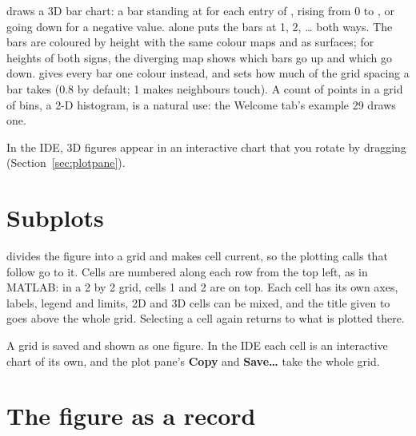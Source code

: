 \documentclass[11pt,a4paper,openany]{report}
\begin{document}
{{


 draws a 3D bar chart: a bar standing at
 for each entry of , rising from 0 to
, or going down for a negative value.  alone
puts the bars at 1, 2, \ldots{} both ways. The bars are coloured by height
with the same colour maps and  as surfaces; for heights of both
signs, the diverging map  shows which bars go up and which go
down.  gives every bar one colour instead, and  sets
how much of the grid spacing a bar takes (0.8 by default; 1 makes neighbours
touch). A count of points in a grid of bins, a 2-D histogram, is a natural use:
the Welcome tab's example 29 draws one.


In the IDE, 3D figures appear in an interactive chart that you rotate by
dragging (Section~\ref{sec:plotpane}).

\section{Subplots}

 divides the figure into a grid and makes cell
 current, so the plotting calls that follow go to it. Cells are
numbered along each row from the top left, as in MATLAB: in a 2 by 2 grid,
cells 1 and 2 are on top. Each cell has its own axes, labels, legend and limits,
2D and 3D cells can be mixed, and the title given to  goes
above the whole grid. Selecting a cell again returns to what is plotted there.


A grid is saved and shown as one figure. In the IDE each cell is an interactive
chart of its own, and the plot pane's \textbf{Copy} and \textbf{Save\ldots} take
the whole grid.

\section{The figure as a record}

}}
\end{document}
